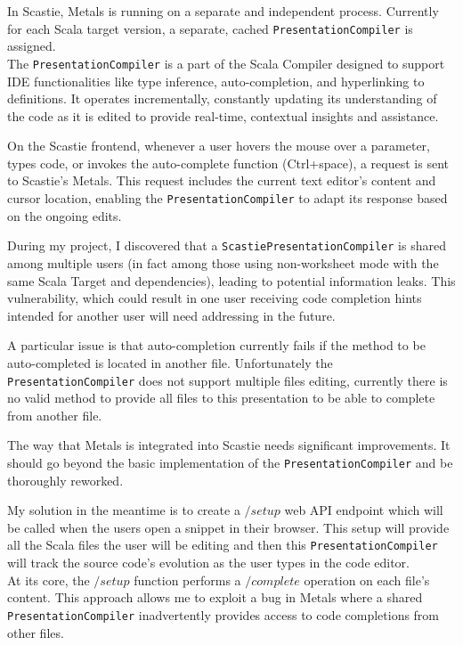 \documentclass[a4paper,11pt,oneside]{report}
\begin{document}
In Scastie, Metals is running on a separate and independent process. Currently for each Scala target version, a separate, cached \lstinline{PresentationCompiler} is assigned.\\
The \lstinline{PresentationCompiler} is a part of the Scala Compiler designed to support IDE functionalities like type inference, auto-completion, and hyperlinking to definitions. It operates incrementally, constantly updating its understanding of the code as it is edited to provide real-time, contextual insights and assistance.

On the Scastie frontend, whenever a user hovers the mouse over a parameter, types code, or invokes the auto-complete function (Ctrl+space), a request is sent to Scastie's Metals. This request includes the current text editor's content and cursor location, enabling the \lstinline{PresentationCompiler} to adapt its response based on the ongoing edits.

During my project, I discovered that a \lstinline{ScastiePresentationCompiler} is shared among multiple users (in fact among those using non-worksheet mode with the same Scala Target and dependencies), leading to potential information leaks. This vulnerability, which could result in one user receiving code completion hints intended for another user will need addressing in the future.

A particular issue is that auto-completion currently fails if the method to be auto-completed is located in another file. Unfortunately the \lstinline{PresentationCompiler} does not support multiple files editing, currently there is no valid method to provide all files to this presentation to be able to complete from another file.

The way that Metals is integrated into Scastie needs significant improvements. It should go beyond the basic implementation of the \lstinline{PresentationCompiler} and be thoroughly reworked.

My solution in the meantime is to create a $/setup$ web API endpoint which will be called when the users open a snippet in their browser. This setup will provide all the Scala files the user will be editing and then this \lstinline{PresentationCompiler} will track the source code's evolution as the user types in the code editor. \\
At its core, the $/setup$ function performs a $/complete$ operation on each file's content. This approach allows me to exploit a bug in Metals where a shared \lstinline{PresentationCompiler} inadvertently provides access to code completions from other files.
\end{document}
